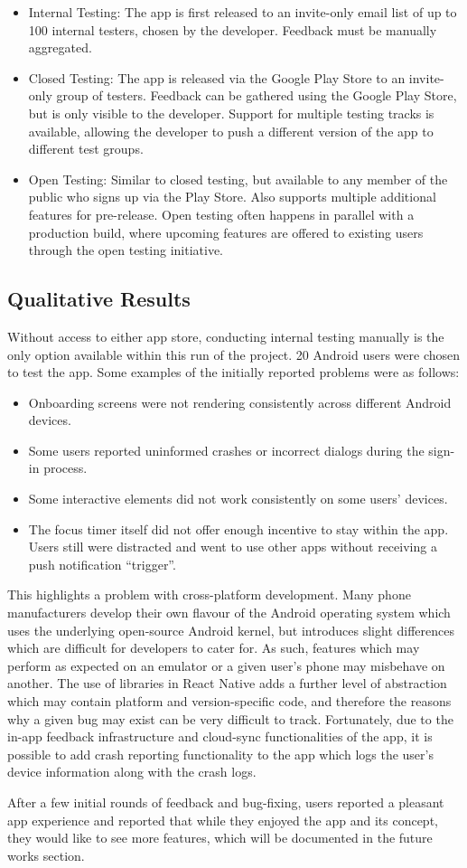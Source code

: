 \begin{itemize}
	\item Internal Testing: The app is first released to an invite-only email list of up to 100 internal testers, chosen by the developer. Feedback must be manually aggregated.
	\item Closed Testing: The app is released via the Google Play Store to an invite-only group of testers. Feedback can be gathered using the Google Play Store, but is only visible to the developer. Support for multiple testing tracks is available, allowing the developer to push a different version of the app to different test groups.
	\item Open Testing: Similar to closed testing, but available to any member of the public who signs up via the Play Store. Also supports multiple additional features for pre-release. Open testing often happens in parallel with a production build, where upcoming features are offered to existing users through the open testing initiative.
\end{itemize}

\subsection{Qualitative Results}
Without access to either app store, conducting internal testing manually is the only option available within this run of the project. 20 Android users were chosen to test the app. Some examples of the initially reported problems were as follows:

\begin{itemize}
	\item Onboarding screens were not rendering consistently across different Android devices.
	\item Some users reported uninformed crashes or incorrect dialogs during the sign-in process.
	\item Some interactive elements did not work consistently on some users' devices.
	\item The focus timer itself did not offer enough incentive to stay within the app. Users still were distracted and went to use other apps without receiving a push notification ``trigger''.
\end{itemize}

This highlights a problem with cross-platform development. Many phone manufacturers develop their own flavour of the Android operating system which uses the underlying open-source Android kernel, but introduces slight differences which are difficult for developers to cater for. As such, features which may perform as expected on an emulator or a given user's phone may misbehave on another. The use of libraries in React Native adds a further level of abstraction which may contain platform and version-specific code, and therefore the reasons why a given bug may exist can be very difficult to track. Fortunately, due to the in-app feedback infrastructure and cloud-sync functionalities of the app, it is possible to add crash reporting functionality to the app which logs the user's device information along with the crash logs.

After a few initial rounds of feedback and bug-fixing, users reported a pleasant app experience and reported that while they enjoyed the app and its concept, they would like to see more features, which will be documented in the future works section.